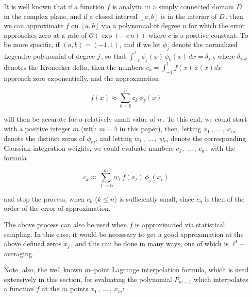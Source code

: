 \documentclass[11pt]{article}
\begin{document}
\vspace{.2in} \noindent It is well known that if a function $f$ is
analytic in a simply connected domain $D$ in the complex plane, and if
a closed interval $[a,b]$ is in the interior of $D$\,, then we can
approximate $f$ on $[a,b]$ via a polynomial of degree $n$ for which
the error approaches zero at a rate of ${\mathcal O}(\exp(- \, c\,
n))$ where $c$ is a positive constant.  To be more specific, if $(a,b)
= (-1,1)$, and if we let $\phi_j$ denote the normalized Legendre
polynomial of degree $j$\,, so that $\int_{-1}^1\phi_j(x) \, \phi_k(x)
\, dx = \delta_{j,k}$ where $\delta_{j,k}$ denotes the Kronecker
delta, then the numbers $c_k = \int_{-1}^1 f(x) \, \phi(x) dx$
approach zero exponentially, and the approximation

\begin{equation}%
  f(x) \approx \sum_{k=0}^n c_k \, \phi_k(x)
\label{equation:4.1}
\end{equation}

\noindent will then be accurate for a relatively small value of $n$\,.  To
this end, we could start with a positive integer $m$ (with $m = 5$ in
this paper), then, letting $x_1\,,\ \ldots\,,\ x_m$ denote the
distinct zeros of $\phi_m$, and letting $w_1\,,\ \ldots\,,\ w_m$
denote the corresponding Gaussian integration weights, we could
evaluate numbers $c_1\,,\ \ldots\,,\ c_n$\,, with the formula

\begin{equation}%
  c_k \approx \displaystyle \sum_{\ell=0}^m w_\ell\,f(x_\ell)\,\phi_j(x_\ell)
  \label{equation:4.2}
\end{equation}

\noindent and stop the process, when $c_k$ ($k \leq n$) is sufficiently
small, since $c_n$ is then of the order of the error of approximation.

\vspace{.2in} \noindent The above process can also be used when $f$ is
approximated via statistical sampling.  In this case, it would be
necessary to get a good approximation at the above defined zeros
$x_j$\,, and this can be done in many ways, one of which is
$\ell^1$--averaging.

\vspace{.1in} \noindent Note, also, the well known $m$--point Lagrange
interpolation formula, which is used extensively in this section, for
evaluating the polynomial $P_{m-1}$ which interpolates a function $f$
at the $m$ points $x_1\,,\ \ldots\,,\ x_m$:
\end{document}
